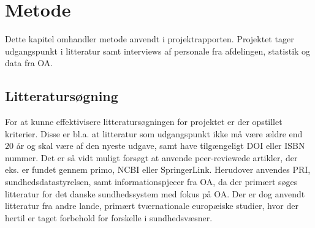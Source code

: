 \chapter{Metode}

Dette kapitel omhandler metode anvendt i projektrapporten. Projektet tager udgangspunkt i litteratur samt interviews af personale fra afdelingen, statistik og data fra OA. 


\section{Litteratursøgning}
For at kunne effektivisere litteratursøgningen for projektet er der opstillet kriterier. Disse er bl.a. at litteratur som udgangspunkt ikke må være ældre end $20$ år og skal være af den nyeste udgave, samt have tilgængeligt DOI eller ISBN nummer. 
Det er så vidt muligt forsøgt at anvende peer-reviewede artikler, der eks. er fundet gennem primo, NCBI eller SpringerLink. Herudover anvendes PRI, sundhedsdatastyrelsen, samt informationspjecer fra OA, da der primært søges litteratur for det danske sundhedssystem med fokus på OA. Der er dog anvendt litteratur fra andre lande, primært tværnationale europæiske studier, hvor der hertil er taget forbehold for forskelle i sundhedsvæsner.


